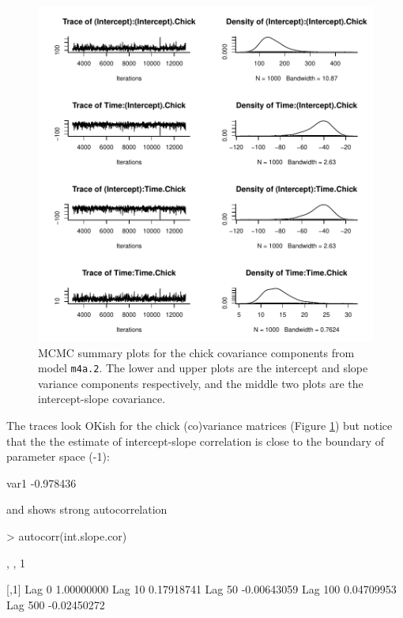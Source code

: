 \documentclass{article}
\begin{document}
\begin{figure}[!h]
\begin{center}
\includegraphics{Lecture4-017}
\end{center}
\caption{MCMC summary plots for the chick covariance components from model \texttt{m4a.2}. The lower and upper plots are the intercept and slope variance components respectively, and the middle two plots are the intercept-slope covariance.}
\label{RR2VCV-fig}
\end{figure}

The traces look OKish for the chick (co)variance matrices (Figure \ref{RR2VCV-fig}) but notice that the the estimate of intercept-slope correlation is close to the boundary of parameter space (-1):

\begin{Schunk}
\begin{Soutput}
     var1 
-0.978436 
\end{Soutput}
\end{Schunk}

and shows strong autocorrelation

\begin{Schunk}
\begin{Sinput}
> autocorr(int.slope.cor)
\end{Sinput}
\begin{Soutput}
, , 1

               [,1]
Lag 0    1.00000000
Lag 10   0.17918741
Lag 50  -0.00643059
Lag 100  0.04709953
Lag 500 -0.02450272
\end{Soutput}
\end{Schunk}
\end{document}
